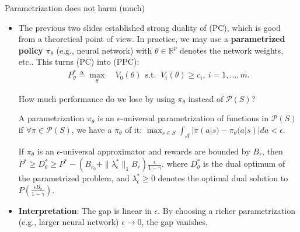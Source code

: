 \documentclass[aspectratio=43, 10pt]{beamer}
\begin{document}
    \begin{frame}[t]{Parametrization does not harm (much)}
    \vspace{-0.3cm}
        \begin{itemize}[leftmargin=*, itemsep=1em]
        \item The previous two slides established strong duality of (PC), which is good from a theoretical point of view. 
        In practice, we may use a \textbf{parametrized policy} $\pi_{\theta}$ (e.g., neural network) with $\theta \in \mathbb{R}^p$ denotes the network weights, etc.. This turns (PC) into (PPC):
          \begin{align} 
          \tag{PPC}
              P_{\theta}^* \triangleq \max_{\theta} & \ V_0(\theta) ~~\text{s.t. }  \ V_i(\theta) \geq c_i, \ i=1,\dots,m.
          \end{align}
        
        How much performance do we lose by using $\pi_{\theta}$ instead of $\mathcal{P}(S)$? 

        \begin{definition}
            A parametrization $\pi_{\theta}$ is an $\epsilon
            $-universal parametrization of functions in $\mathcal{P}(S)$ if $\forall \pi \in \mathcal{P}(S)$, we have a $\pi_{\theta}$ of it: $\max_{s \in S} \int_{\mathcal{A}} |\pi(a|s) - \pi_{\theta}(a|s)| da < \epsilon$. 
        \end{definition}
        
        If $\pi_{\theta}$ is an $\epsilon$-universal approximator and rewards are bounded by $B_r$, then $P^* \geq D_{\theta}^* \geq P^* - \left(B_{r_0} + \| \lambda_{\epsilon}^* \|_1 B_r \right) \frac{\epsilon}{1-\gamma}.$
          where $D_{\theta}^*$ is the dual optimum of the parametrized problem, and $\lambda_{\epsilon}^*\geq 0$ denotes the optimal dual solution to $P( \frac{\epsilon B_r}{1-\gamma})$. 
          
        \item \textbf{Interpretation}:
          The gap is linear in $\epsilon$.
          By choosing a richer parametrization (e.g., larger neural network)  $\epsilon \to 0$, the gap vanishes. \smiley
          
    \end{itemize}
    \end{frame}
\end{document}
